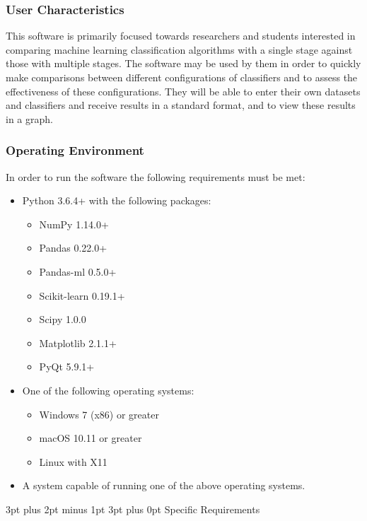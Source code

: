 \documentclass[12pt,a4paper]{article}
\makeatletter
\renewcommand\subsection{\@startsection {subsection}{1}{2mm} %
                               {3pt plus 2pt minus 1pt} %
                               {3pt plus 0pt} %
                               {\normalfont\bfseries}}
\makeatother
\begin{document}
\subsubsection{User Characteristics}
This software is primarily focused towards researchers and students interested in comparing machine learning classification algorithms with a single stage against those with multiple stages. The software may be used by them in order to quickly make comparisons between different configurations of classifiers and to assess the effectiveness of these configurations. They will be able to enter their own datasets and classifiers and receive results in a standard format, and to view these results in a graph.
\subsubsection{Operating Environment}
In order to run the software the following requirements must be met:
\begin{itemize}
	\item{Python 3.6.4+ with the following packages:}
	\begin{itemize}
		\item{NumPy 1.14.0+}
		\item{Pandas 0.22.0+}
		\item{Pandas-ml 0.5.0+}
		\item{Scikit-learn 0.19.1+}
		\item{Scipy 1.0.0}
		\item{Matplotlib 2.1.1+}
		\item{PyQt 5.9.1+}
	\end{itemize}
\item{One of the following operating systems:}
	\begin{itemize}
		\item{Windows 7 (x86) or greater}
		\item{macOS 10.11 or greater}
		\item{Linux with X11}
	\end{itemize}
	\item{A system capable of running one of the above operating systems.}
\end{itemize}

\subsection{Specific Requirements}
\end{document}

